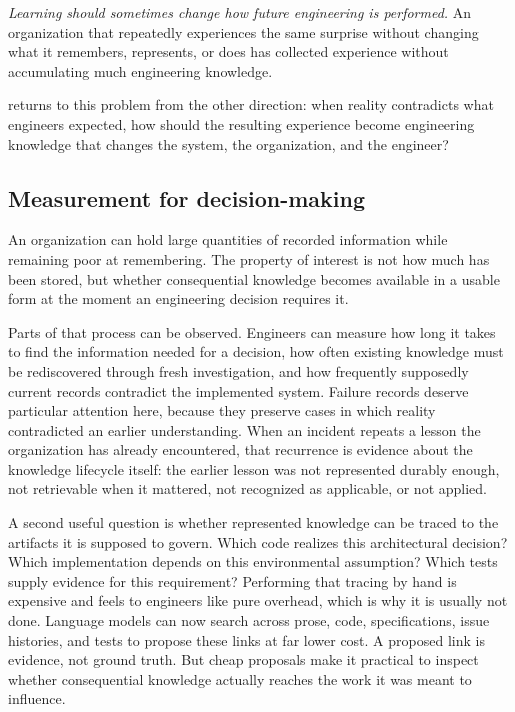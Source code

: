 \emph{Learning should sometimes change how future engineering is performed.} An organization that
repeatedly experiences the same surprise without changing what it remembers, represents, or does has
collected experience without accumulating much engineering knowledge.

\citet{ch-failure-aware-engineering} returns to this problem from the other direction: when reality
contradicts what engineers expected, how should the resulting experience become engineering knowledge
that changes the system, the organization, and the engineer?

\subsection{Measurement for decision-making}\label{sec-measurement-engineering-knowledge}

An organization can hold large quantities of recorded information while remaining poor at
remembering. The property of interest is not how much has been stored, but whether consequential
knowledge becomes available in a usable form at the moment an engineering decision requires it.

Parts of that process can be observed. Engineers can measure how long it takes to find the
information needed for a decision, how often existing knowledge must be rediscovered through fresh
investigation, and how frequently supposedly current records contradict the implemented system.
Failure records deserve particular attention here, because they preserve cases in which reality
contradicted an earlier understanding. When an incident repeats a lesson the organization has already
encountered, that recurrence is evidence about the knowledge lifecycle itself: the earlier lesson was
not represented durably enough, not retrievable when it mattered, not recognized as applicable, or
not applied.

A second useful question is whether represented knowledge can be traced to the artifacts it is
supposed to govern. Which code realizes this architectural decision? Which implementation depends on
this environmental assumption? Which tests supply evidence for this requirement? Performing that
tracing by hand is expensive and feels to engineers like pure overhead, which is why it is usually
not done. Language models can now search across prose, code, specifications, issue histories, and
tests to propose these links at far lower cost. A proposed link is evidence, not ground truth. But
cheap proposals make it practical to inspect whether consequential knowledge actually reaches the
work it was meant to influence.

